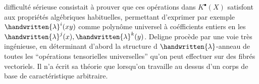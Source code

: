 {\begin{tikzpicture}[x=1em,y=1em,baseline=(b.base)]
\end{tikzpicture}} difficulté sérieuse consistait à prouver que ces opérations dans $K^\bullet(X)$ satisfont aux propriétés algébriques habituelles, permettant d'exprimer par exemple $\handwritten{\lambda}^i(xy)$ comme polynôme universel à coéfficients entiers en les $\handwritten{\lambda}^j(x),\handwritten{\lambda}^k(y)$. Deligne procède par une voie très ingénieuse, en déterminant d'abord la structure d $\handwritten{\lambda}$-anneau de toutes les ``opérations tensorielles universelles'' qu'on peut effectuer sur des fibrés vectoriels. Il n'a écrit sa théorie que lorsqu'on travaille au dessus d'un corps de base \handwritten{(}de caractéristique arbitraire\handwritten{)}. 

